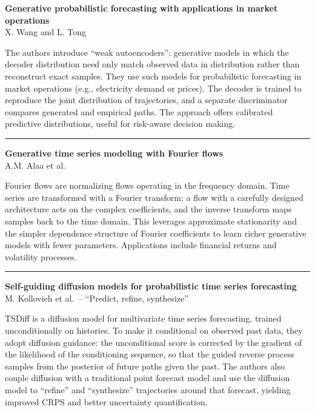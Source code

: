 \documentclass[a5paper]{article}
\begin{document}
\textbf{Generative probabilistic forecasting with applications in market
operations}\\
X. Wang and L. Tong

The authors introduce ``weak autoencoders'': generative models in which
the decoder distribution need only match observed data in distribution
rather than reconstruct exact samples. They use such models for
probabilistic forecasting in market operations (e.g., electricity demand
or prices). The decoder is trained to reproduce the joint distribution
of trajectories, and a separate discriminator compares generated and
empirical paths. The approach offers calibrated predictive
distributions, useful for risk-aware decision making.

\begin{center}\rule{0.5\linewidth}{0.5pt}\end{center}

\textbf{Generative time series modeling with Fourier flows}\\
A.M. Alaa et al.

Fourier flows are normalizing flows operating in the frequency domain.
Time series are transformed with a Fourier transform; a flow with a
carefully designed architecture acts on the complex coefficients, and
the inverse transform maps samples back to the time domain. This
leverages approximate stationarity and the simpler dependence structure
of Fourier coefficients to learn richer generative models with fewer
parameters. Applications include financial returns and volatility
processes.

\begin{center}\rule{0.5\linewidth}{0.5pt}\end{center}

\textbf{Self-guiding diffusion models for probabilistic time series
forecasting}\\
M. Kollovieh et al.~-- ``Predict, refine, synthesize''

TSDiff is a diffusion model for multivariate time series forecasting,
trained unconditionally on histories. To make it conditional on observed
past data, they adopt diffusion guidance: the unconditional score is
corrected by the gradient of the likelihood of the conditioning
sequence, so that the guided reverse process samples from the posterior
of future paths given the past. The authors also couple diffusion with a
traditional point forecast model and use the diffusion model to
``refine'' and ``synthesize'' trajectories around that forecast,
yielding improved CRPS and better uncertainty quantification.
\end{document}
